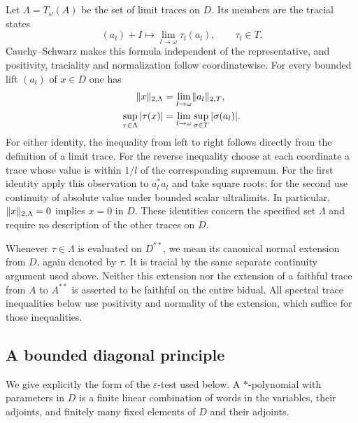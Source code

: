 Let $\Lambda=T_\omega(A)$ be the set of limit traces on $D$. Its
members are the tracial states
\[
 (a_l)+I\longmapsto\lim_{l\to\omega}\tau_l(a_l),
 \qquad \tau_l\in T.
\]
Cauchy--Schwarz makes this formula independent of the representative,
and positivity, traciality and normalization follow coordinatewise.
For every bounded lift $(a_l)$ of $x\in D$ one has
\begin{equation}
\label{u:eq:limit-trace-norm}
 \begin{split}
 \lVert x\rVert_{2,\Lambda}
   &=\lim_{l\to\omega}\lVert a_l\rVert_{2,T},\\
 \sup_{\tau\in\Lambda}|\tau(x)|
   &=\lim_{l\to\omega}\sup_{\sigma\in T}|\sigma(a_l)|.
 \end{split}
\end{equation}
For either identity, the inequality from left to right follows
directly from the definition of a limit trace. For the reverse
inequality choose at each coordinate a trace whose value is within
$1/l$ of the corresponding supremum. For the first identity apply
this observation to $a_l^*a_l$ and take square roots; for the second
use continuity of absolute value under bounded scalar ultralimits.
In particular, $\lVert x\rVert_{2,\Lambda}=0$ implies $x=0$ in $D$.
These identities concern the specified set $\Lambda$ and require
no description of the other traces on $D$.

Whenever $\tau\in\Lambda$ is evaluated on $D^{**}$, we mean its
canonical normal extension from $D$, again denoted by $\tau$.
It is tracial by the same separate continuity argument used above.
Neither this extension nor the extension of a faithful trace from
$A$ to $A^{**}$ is asserted to be faithful on the entire bidual.
All spectral trace inequalities below use positivity and normality
of the extension, which suffice for those inequalities.

\subsection{A bounded diagonal principle}

We give explicitly the form of the $\varepsilon$-test used below.
A $*$-polynomial with parameters in $D$ is a finite linear
combination of words in the variables, their adjoints, and finitely
many fixed elements of $D$ and their adjoints.

